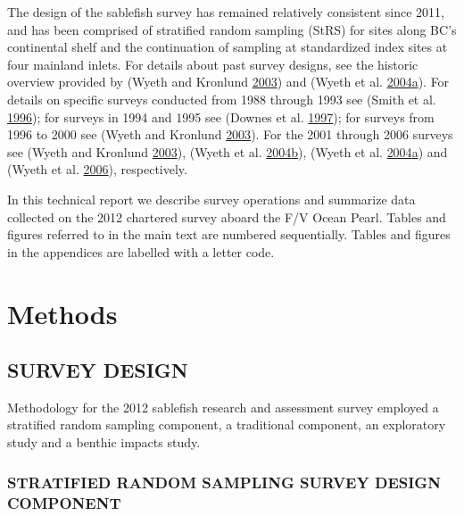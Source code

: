 \documentclass[12pt]{article}\usepackage[]{graphicx}\usepackage[]{color}
\begin{document}
The design of the sablefish survey has remained relatively consistent since 2011, and has been comprised of stratified random sampling (StRS) for sites along BC's continental shelf and the continuation of sampling at standardized index sites at four mainland inlets. For details about past survey designs, see the historic overview provided by (Wyeth and Kronlund \protect\hyperlink{ref-Wyeth2003}{2003}) and (Wyeth et al. \protect\hyperlink{ref-Wyeth2004b}{2004}\protect\hyperlink{ref-Wyeth2004b}{a}). For details on specific surveys conducted from 1988 through 1993 see (Smith et al. \protect\hyperlink{ref-Smith1996}{1996}); for surveys in 1994 and 1995 see (Downes et al. \protect\hyperlink{ref-Downes1997}{1997}); for surveys from 1996 to 2000 see (Wyeth and Kronlund \protect\hyperlink{ref-Wyeth2003}{2003}). For the 2001 through 2006 surveys see (Wyeth and Kronlund \protect\hyperlink{ref-Wyeth2003}{2003}), (Wyeth et al. \protect\hyperlink{ref-Wyeth2004a}{2004}\protect\hyperlink{ref-Wyeth2004a}{b}), (Wyeth et al. \protect\hyperlink{ref-Wyeth2004b}{2004}\protect\hyperlink{ref-Wyeth2004b}{a}) and (Wyeth et al. \protect\hyperlink{ref-Wyeth2006}{2006}), respectively.

In this technical report we describe survey operations and summarize data collected on the 2012 chartered survey aboard the F/V Ocean Pearl. Tables and figures referred to in the main text are numbered sequentially. Tables and figures in the appendices are labelled with a letter code.

\hypertarget{methods}{%
\section{Methods}\label{methods}}

\hypertarget{survey-design}{%
\subsection{SURVEY DESIGN}\label{survey-design}}

Methodology for the 2012 sablefish research and assessment survey employed a stratified random sampling component, a traditional component, an exploratory study and a benthic impacts study.

\hypertarget{stratified-random-sampling-survey-design-component}{%
\subsubsection{STRATIFIED RANDOM SAMPLING SURVEY DESIGN COMPONENT}\label{stratified-random-sampling-survey-design-component}}
\end{document}
